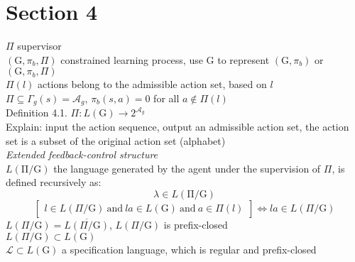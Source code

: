 \documentclass{article}
\begin{document}
\section{Section 4}
$\Pi$ \quad supervisor\\
$(\mathrm{G},\pi_b,\Pi)$ \quad constrained learning process, use $\mathrm{G}$ to represent $(\mathrm{G},\pi_b)$ or $(\mathrm{G},\pi_b,\Pi)$\\
$\Pi(l)$ \quad actions belong to the admissible action set, based on $l$\\
$\Pi \subseteq \Gamma_g(s)=\mathcal{A}_g$, $\pi_b(s,a)=0$ for all $a \notin \Pi(l)$\\
Definition 4.1. $\Pi: L(\mathrm{G}) \rightarrow2^{\mathcal{A}_g}$\\
Explain: input the action sequence, output an admissible action set, the action set is a subset of the original action set (alphabet)\\
\textit{Extended feedback-control structure}\\
$L(\mathrm{\Pi/\mathrm{G}})$ \quad the language generated by the agent under the supervision of $\Pi$, is defined recursively as:
$$\lambda \in L(\mathrm{\Pi/\mathrm{G}})$$
$$\left.\left[\begin{array}{c}l\in L(\Pi/\mathrm{G})\ \mathrm{and} \ l a \in L(\mathrm{G})\ \mathrm{and}\ a\in\Pi(l)\end{array}\right.\right]\Leftrightarrow la \in L(\Pi/\mathrm{G})$$
$L(\Pi/\mathrm{G})=\overline{L(\Pi/\mathrm{G})}$, $L(\Pi/\mathrm{G})$ is prefix-closed\\
$L(\Pi/\mathrm{G}) \subset L(\mathrm{G})$\\
$\mathcal{L}\subset L(\mathrm{G})$ a specification language, which is regular and prefix-closed\\
\end{document}
